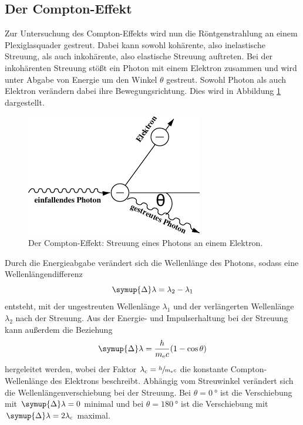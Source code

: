 \subsection{Der Compton-Effekt}
\label{sec:compton_effekt}

    Zur Untersuchung des Compton-Effekts wird nun die Röntgenstrahlung an einem Plexiglasquader gestreut.
    Dabei kann sowohl kohärente, 
    also inelastische Streuung,
    als auch inkohärente,
    also elastische Streuung auftreten.
    Bei der inkohärenten Streuung stößt ein Photon mit einem Elektron zusammen und wird unter Abgabe von Energie um den Winkel $\theta$ gestreut.
    Sowohl Photon als auch Elektron verändern dabei ihre Bewegungsrichtung.
    Dies wird in Abbildung \ref{fig:compton} dargestellt.
    \begin{figure}[H]
        \centering
        \includegraphics[scale=1.5]{content/img/Abb_1.pdf}
        \caption{Der Compton-Effekt: Streuung eines Photons an einem Elektron.}
        \label{fig:compton}
    \end{figure}
    Durch die Energieabgabe verändert sich die Wellenlänge des Photons,
    sodass eine Wellenlängendifferenz
    \begin{equation}
        \symup{\Delta}\lambda = \lambda_2 - \lambda_1
        \label{eqn:wellenlängendifferenz}
    \end{equation}
    entsteht,
    mit der ungestreuten Wellenlänge $\lambda_1$ und der verlängerten Wellenlänge $\lambda_2$ nach der Streuung.
    Aus der Energie- und Impulserhaltung bei der Streuung kann außerdem die Beziehung
    \begin{equation}
        \symup{\Delta}\lambda = \frac{h}{m_\text{e} c}(1 - \cos{\theta})
        \label{eqn:verschiebung_winkelabhängig}
    \end{equation}
    hergeleitet werden,
    wobei der Faktor $\lambda_\text{c} = \sfrac{h}{m_\text{e}c}$ die konstante Compton-Wellenlänge des Elektrons beschreibt.
    Abhängig vom Streuwinkel verändert sich die Wellenlängenverschiebung bei der Streuung.
    Bei $\theta = \SI{0}{\degree}$ ist die Verschiebung mit $\symup{\Delta}\lambda = 0$ minimal und bei $\theta = \SI{180}{\degree}$ ist die Verschiebung mit $\symup{\Delta}\lambda = 2\lambda_\text{c}$ maximal.
